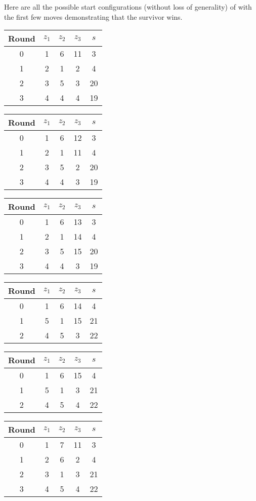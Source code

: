 
Here are all the possible start configurations (without loss of generality)
of  
with the first few moves demonstrating that the survivor wins. \label{appendix:planarZombies}

\begin{tabular}{c | c | c | c | c }
Round & $z_1$ & $z_2$ & $z_3$ & $s$ \\
\hline
0 & 1 & 6 & 11 & 3 \\
1 & 2 & 1 & 2 & 4 \\
2 & 3 & 5 & 3 & 20 \\
3 & 4 & 4 & 4 & 19
\end{tabular}

\begin{tabular}{c | c | c | c | c }
Round & $z_1$ & $z_2$ & $z_3$ & $s$ \\
\hline
0 & 1 & 6 & 12 & 3 \\
1 & 2 & 1 & 11 & 4 \\
2 & 3 & 5 & 2 & 20 \\
3 & 4 & 4 & 3 & 19
\end{tabular}

\begin{tabular}{c | c | c | c | c }
Round & $z_1$ & $z_2$ & $z_3$ & $s$ \\
\hline
0 & 1 & 6 & 13 & 3 \\
1 & 2 & 1 & 14 & 4 \\
2 & 3 & 5 & 15 & 20 \\
3 & 4 & 4 & 3 & 19
\end{tabular}

\begin{tabular}{c | c | c | c | c }
Round & $z_1$ & $z_2$ & $z_3$ & $s$ \\
\hline
0 & 1 & 6 & 14 & 4 \\
1 & 5 & 1 & 15 & 21 \\
2 & 4 & 5 & 3 & 22 \\
\end{tabular}

\begin{tabular}{c | c | c | c | c }
Round & $z_1$ & $z_2$ & $z_3$ & $s$ \\
\hline
0 & 1 & 6 & 15 & 4 \\
1 & 5 & 1 & 3 & 21 \\
2 & 4 & 5 & 4 & 22 \\
\end{tabular}

\begin{tabular}{c | c | c | c | c }
Round & $z_1$ & $z_2$ & $z_3$ & $s$ \\
\hline
0 & 1 & 7 & 11 & 3 \\
1 & 2 & 6 & 2 & 4 \\
2 & 3 & 1 & 3 & 21 \\
3 & 4 & 5 & 4 & 22
\end{tabular}

